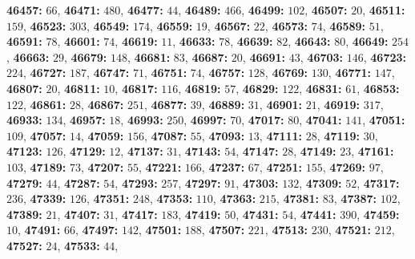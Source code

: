 \textsf{\bfseries 46457:} $66$, \textsf{\bfseries 46471:} $480$, \textsf{\bfseries 46477:} $44$, \textsf{\bfseries 46489:} $466$, \textsf{\bfseries 46499:} $102$, \textsf{\bfseries 46507:} $20$, \textsf{\bfseries 46511:} $159$, \textsf{\bfseries 46523:} $303$, \textsf{\bfseries 46549:} $174$, \textsf{\bfseries 46559:} $19$, \textsf{\bfseries 46567:} $22$, \textsf{\bfseries 46573:} $74$, \textsf{\bfseries 46589:} $51$, \textsf{\bfseries 46591:} $78$, \textsf{\bfseries 46601:} $74$, \textsf{\bfseries 46619:} $11$, \textsf{\bfseries 46633:} $78$, \textsf{\bfseries 46639:} $82$, \textsf{\bfseries 46643:} $80$, \textsf{\bfseries 46649:} $254$, \textsf{\bfseries 46663:} $29$, \textsf{\bfseries 46679:} $148$, \textsf{\bfseries 46681:} $83$, \textsf{\bfseries 46687:} $20$, \textsf{\bfseries 46691:} $43$, \textsf{\bfseries 46703:} $146$, \textsf{\bfseries 46723:} $224$, \textsf{\bfseries 46727:} $187$, \textsf{\bfseries 46747:} $71$, \textsf{\bfseries 46751:} $74$, \textsf{\bfseries 46757:} $128$, \textsf{\bfseries 46769:} $130$, \textsf{\bfseries 46771:} $147$, \textsf{\bfseries 46807:} $20$, \textsf{\bfseries 46811:} $10$, \textsf{\bfseries 46817:} $116$, \textsf{\bfseries 46819:} $57$, \textsf{\bfseries 46829:} $122$, \textsf{\bfseries 46831:} $61$, \textsf{\bfseries 46853:} $122$, \textsf{\bfseries 46861:} $28$, \textsf{\bfseries 46867:} $251$, \textsf{\bfseries 46877:} $39$, \textsf{\bfseries 46889:} $31$, \textsf{\bfseries 46901:} $21$, \textsf{\bfseries 46919:} $317$, \textsf{\bfseries 46933:} $134$, \textsf{\bfseries 46957:} $18$, \textsf{\bfseries 46993:} $250$, \textsf{\bfseries 46997:} $70$, \textsf{\bfseries 47017:} $80$, \textsf{\bfseries 47041:} $141$, \textsf{\bfseries 47051:} $109$, \textsf{\bfseries 47057:} $14$, \textsf{\bfseries 47059:} $156$, \textsf{\bfseries 47087:} $55$, \textsf{\bfseries 47093:} $13$, \textsf{\bfseries 47111:} $28$, \textsf{\bfseries 47119:} $30$, \textsf{\bfseries 47123:} $126$, \textsf{\bfseries 47129:} $12$, \textsf{\bfseries 47137:} $31$, \textsf{\bfseries 47143:} $54$, \textsf{\bfseries 47147:} $28$, \textsf{\bfseries 47149:} $23$, \textsf{\bfseries 47161:} $103$, \textsf{\bfseries 47189:} $73$, \textsf{\bfseries 47207:} $55$, \textsf{\bfseries 47221:} $166$, \textsf{\bfseries 47237:} $67$, \textsf{\bfseries 47251:} $155$, \textsf{\bfseries 47269:} $97$, \textsf{\bfseries 47279:} $44$, \textsf{\bfseries 47287:} $54$, \textsf{\bfseries 47293:} $257$, \textsf{\bfseries 47297:} $91$, \textsf{\bfseries 47303:} $132$, \textsf{\bfseries 47309:} $52$, \textsf{\bfseries 47317:} $236$, \textsf{\bfseries 47339:} $126$, \textsf{\bfseries 47351:} $248$, \textsf{\bfseries 47353:} $110$, \textsf{\bfseries 47363:} $215$, \textsf{\bfseries 47381:} $83$, \textsf{\bfseries 47387:} $102$, \textsf{\bfseries 47389:} $21$, \textsf{\bfseries 47407:} $31$, \textsf{\bfseries 47417:} $183$, \textsf{\bfseries 47419:} $50$, \textsf{\bfseries 47431:} $54$, \textsf{\bfseries 47441:} $390$, \textsf{\bfseries 47459:} $10$, \textsf{\bfseries 47491:} $66$, \textsf{\bfseries 47497:} $142$, \textsf{\bfseries 47501:} $188$, \textsf{\bfseries 47507:} $221$, \textsf{\bfseries 47513:} $230$, \textsf{\bfseries 47521:} $212$, \textsf{\bfseries 47527:} $24$, \textsf{\bfseries 47533:} $44$, 
